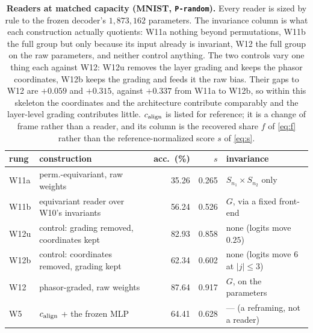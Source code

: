 \begin{table}[t]
\centering\small
\caption{\textbf{Readers at matched capacity (MNIST, \texttt{P-random}).} Every reader is sized by rule to the frozen decoder's $1{,}873{,}162$ parameters. The invariance column is what each construction actually quotients: W11a nothing beyond permutations, W11b the full group but only because its input already is invariant, W12 the full group on the raw parameters, and neither control anything. The two controls vary one thing each against W12: W12u removes the layer grading and keeps the phasor coordinates, W12b keeps the grading and feeds it the raw bias. Their gaps to W12 are $+0.059$ and $+0.315$, against $+0.337$ from W11a to W12b, so within this skeleton the coordinates and the architecture contribute comparably and the layer-level grading contributes little. $c_{\mathrm{align}}$ is listed for reference; it is a change of frame rather than a reader, and its column is the recovered share $f$ of \eqref{eq:f} rather than the reference-normalized score $s$ of \eqref{eq:s}.}
\label{tab:w12}
\begin{tabular}{@{}llrrl@{}}
\toprule
rung & construction & acc.\ (\%) & $s$ & invariance \\
\midrule
W11a & perm.-equivariant, raw weights & 35.26 & 0.265 & $S_{n_1}\times S_{n_2}$ only \\
W11b & equivariant reader over W10's invariants & 56.24 & 0.526 & $G$, via a fixed front-end \\
W12u & \quad control: grading removed, coordinates kept & 82.93 & 0.858 & none (logits move $0.25$) \\
W12b & \quad control: coordinates removed, grading kept & 62.34 & 0.602 & none (logits move $6$ at $|j|\le3$) \\
W12 & phasor-graded, raw weights & 87.64 & 0.917 & $G$, on the parameters \\
W5 & $c_{\mathrm{align}}$ + the frozen MLP & 64.41 & 0.628 & --- (a reframing, not a reader) \\
\bottomrule
\end{tabular}
\end{table}
